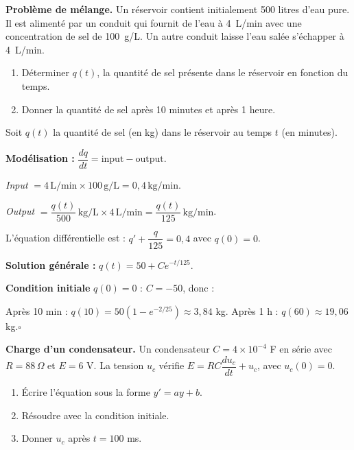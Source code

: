 \clearpage
{}

\begin{ExoResolu}
\textbf{Probl\`eme de m\'elange.}
Un r\'eservoir contient initialement 500 litres d'eau pure. Il est aliment\'e par un
conduit qui fournit de l'eau \`a 4~L/min avec une concentration de sel de 100~g/L.
Un autre conduit laisse l'eau sal\'ee s'\'echapper \`a 4~L/min.
\begin{enumerate}
  \item D\'eterminer $q(t)$, la quantit\'e de sel pr\'esente dans le r\'eservoir en fonction du temps.
  \item Donner la quantit\'e de sel apr\`es 10 minutes et apr\`es 1 heure.
\end{enumerate}
\end{ExoResolu}

\begin{Correction}
Soit $q(t)$ la quantit\'e de sel (en kg) dans le r\'eservoir au temps $t$ (en minutes).

\textbf{Mod\'elisation :} $\dfrac{dq}{dt}=\text{input}-\text{output}$.

\textit{Input} $=4\,\text{L/min}\times 100\,\text{g/L}=0{,}4\,\text{kg/min}$.

\textit{Output} $=\dfrac{q(t)}{500}\,\text{kg/L}\times 4\,\text{L/min}=\dfrac{q(t)}{125}\,\text{kg/min}$.

L'\'equation diff\'erentielle est :
$q'+\dfrac{q}{125}=0{,}4$ avec $q(0)=0$.

\textbf{Solution g\'en\'erale :} $q(t)=50+Ce^{-t/125}$.

\textbf{Condition initiale} $q(0)=0$ : $C=-50$, donc :

Apr\`es 10 min : $q(10)=50(1-e^{-2/25})\approx 3{,}84$ kg.
Apr\`es 1 h : $q(60)\approx 19{,}06$ kg.\hfill$\square$
\end{Correction}

\begin{ExoResolu}
\textbf{Charge d'un condensateur.}
Un condensateur $C=4\times 10^{-4}$ F en s\'erie avec $R=88\,\Omega$ et $E=6$ V.
La tension $u_c$ v\'erifie $E=RC\dfrac{du_c}{dt}+u_c$, avec $u_c(0)=0$.
\begin{enumerate}
  \item \'Ecrire l'\'equation sous la forme $y'=ay+b$.
  \item R\'esoudre avec la condition initiale.
  \item Donner $u_c$ apr\`es $t=100$ ms.
\end{enumerate}
\end{ExoResolu}

